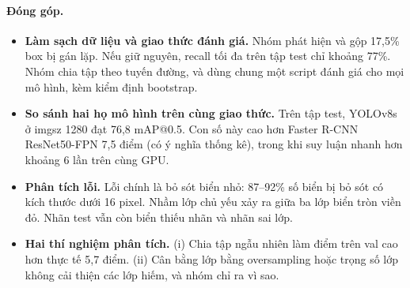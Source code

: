 \paragraph{Đóng góp.}
\begin{itemize}
\item \textbf{Làm sạch dữ liệu và giao thức đánh giá.} Nhóm phát hiện và gộp 17,5\% box bị gán lặp. Nếu giữ nguyên, recall tối đa trên tập test chỉ khoảng 77\%. Nhóm chia tập theo tuyến đường, và dùng chung một script đánh giá cho mọi mô hình, kèm kiểm định bootstrap.
\item \textbf{So sánh hai họ mô hình trên cùng giao thức.} Trên tập test, YOLOv8s ở imgsz 1280 đạt 76,8 mAP@0.5. Con số này cao hơn Faster R-CNN ResNet50-FPN 7,5 điểm (có ý nghĩa thống kê), trong khi suy luận nhanh hơn khoảng 6 lần trên cùng GPU.
\item \textbf{Phân tích lỗi.} Lỗi chính là bỏ sót biển nhỏ: 87--92\% số biển bị bỏ sót có kích thước dưới 16 pixel. Nhầm lớp chủ yếu xảy ra giữa ba lớp biển tròn viền đỏ. Nhãn test vẫn còn biển thiếu nhãn và nhãn sai lớp.
\item \textbf{Hai thí nghiệm phân tích.} (i) Chia tập ngẫu nhiên làm điểm trên val cao hơn thực tế 5,7 điểm. (ii) Cân bằng lớp bằng oversampling hoặc trọng số lớp không cải thiện các lớp hiếm, và nhóm chỉ ra vì sao.
\end{itemize}
